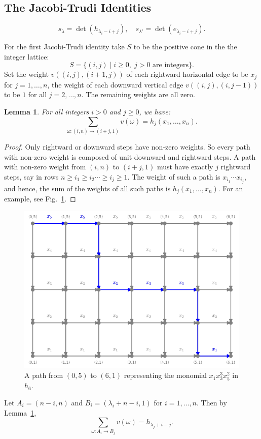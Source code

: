 \documentclass[12pt]{amsart}
\newtheorem{lemma}[theorem]{Lemma}
\theoremstyle{definition}
\theoremstyle{example}
\begin{document}
\subsection{The Jacobi-Trudi Identities}
\label{sec:jacobi-trudi-ident}
\begin{displaymath}
  s_\lambda = \det(h_{\lambda_i-i+j}), \quad s_{\lambda'} = \det(e_{\lambda_i-i+j}).
\end{displaymath}

For the first Jacobi-Trudi identity take $S$ to be the positive cone in the the integer lattice:
\begin{displaymath}
  S = \{(i,j)\mid i\geq 0,\; j>0 \text{ are integers}\}.
\end{displaymath}
Set the weight $v((i,j), (i+1,j))$ of each rightward horizontal edge to be $x_j$ for $j=1,\dotsc, n$, the weight of each downward vertical edge $v((i,j), (i,j-1))$ to be $1$ for all $j=2,\dotsc,n$.
The remaining weights are all zero.
\begin{lemma}
  \label{lemma:entry}
  For all integers $i>0$ and $j\geq 0$, we have:
  \begin{displaymath}
    \sum_{\omega:(i, n)\to (i+j, 1)} v(\omega) = h_j(x_1,\dotsc,x_n).
  \end{displaymath}
\end{lemma}
\begin{proof}
  Only rightward or downward steps have non-zero weights.
  So every path with non-zero weight is composed of unit downward and rightward steps.
  A path with non-zero weight from $(i, n)$ to $(i+j, 1)$ must have exactly $j$ rightward steps, say in rows $n\geq i_1\geq i_2 \dotsb \geq i_j\geq 1$.
  The weight of such a path is $x_{i_1}\dotsb x_{i_j}$, and hence, the sum of the weights of all such paths is $h_j(x_1,\dotsc, x_n)$. For an example, see Fig.~\ref{fig:path_example}.
\end{proof}
\begin{figure}
  \centering
  \includegraphics[width=\textwidth]{path_example.png}
  \caption{A path from $(0, 5)$ to $(6, 1)$ representing the monomial $x_1x_3^3x_5^2$ in $h_6$.}
  \label{fig:path_example}
\end{figure}
Let $A_i = (n-i, n)$ and $B_i=(\lambda_i+n-i, 1)$ for $i=1,\dotsc, n$.
Then  by Lemma~\ref{lemma:entry},
\begin{displaymath}
  \sum_{\omega:A_i\to B_j} v(\omega) = h_{\lambda_j+i-j}.
\end{displaymath}
\end{document}
